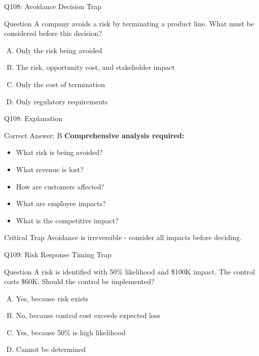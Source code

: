 \documentclass{beamer}
\begin{document}
	\begin{frame}{Q108: Avoidance Decision Trap}
		\begin{block}{Question}
			A company avoids a risk by terminating a product line. What must be considered before this decision?
		\end{block}
		\begin{enumerate}[(A)]
			\item Only the risk being avoided
			\item The risk, opportunity cost, and stakeholder impact
			\item Only the cost of termination
			\item Only regulatory requirements
		\end{enumerate}
	\end{frame}
	
	\begin{frame}{Q108: Explanation}
		\begin{block}{Correct Answer: B}
			\textbf{Comprehensive analysis required:}
			\begin{itemize}
				\item What risk is being avoided?
				\item What revenue is lost?
				\item How are customers affected?
				\item What are employee impacts?
				\item What is the competitive impact?
			\end{itemize}
		\end{block}
		\begin{alertblock}{Critical Trap}
			Avoidance is irreversible - consider all impacts before deciding.
		\end{alertblock}
	\end{frame}
	
	\begin{frame}{Q109: Risk Response Timing Trap}
		\begin{block}{Question}
			A risk is identified with 50\% likelihood and \$100K impact. The control costs \$60K. Should the control be implemented?
		\end{block}
		\begin{enumerate}[(A)]
			\item Yes, because risk exists
			\item No, because control cost exceeds expected loss
			\item Yes, because 50\% is high likelihood
			\item Cannot be determined
		\end{enumerate}
	\end{frame}
	
\end{document}
